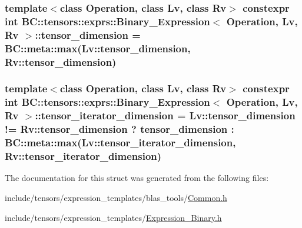 \subsubsection[{\texorpdfstring{tensor\+\_\+dimension}{tensor_dimension}}]{\setlength{\rightskip}{0pt plus 5cm}template$<$class Operation, class Lv, class Rv$>$ constexpr int {\bf B\+C\+::tensors\+::exprs\+::\+Binary\+\_\+\+Expression}$<$ Operation, Lv, Rv $>$\+::tensor\+\_\+dimension = B\+C\+::meta\+::max(Lv\+::tensor\+\_\+dimension, Rv\+::tensor\+\_\+dimension)\hspace{0.3cm}{\ttfamily [static]}}\hypertarget{structBC_1_1tensors_1_1exprs_1_1Binary__Expression_a73afe6b099afa4ef242e6eb7be50ebef}{}\label{structBC_1_1tensors_1_1exprs_1_1Binary__Expression_a73afe6b099afa4ef242e6eb7be50ebef}
\subsubsection[{\texorpdfstring{tensor\+\_\+iterator\+\_\+dimension}{tensor_iterator_dimension}}]{\setlength{\rightskip}{0pt plus 5cm}template$<$class Operation, class Lv, class Rv$>$ constexpr int {\bf B\+C\+::tensors\+::exprs\+::\+Binary\+\_\+\+Expression}$<$ Operation, Lv, Rv $>$\+::tensor\+\_\+iterator\+\_\+dimension = Lv\+::tensor\+\_\+dimension != Rv\+::tensor\+\_\+dimension ? {\bf tensor\+\_\+dimension} \+: B\+C\+::meta\+::max(Lv\+::tensor\+\_\+iterator\+\_\+dimension, Rv\+::tensor\+\_\+iterator\+\_\+dimension)\hspace{0.3cm}{\ttfamily [static]}}\hypertarget{structBC_1_1tensors_1_1exprs_1_1Binary__Expression_a5fce7af061a989dafb9bed466c811f0d}{}\label{structBC_1_1tensors_1_1exprs_1_1Binary__Expression_a5fce7af061a989dafb9bed466c811f0d}


The documentation for this struct was generated from the following files\+:\begin{DoxyCompactItemize}
\item 
include/tensors/expression\+\_\+templates/blas\+\_\+tools/\hyperlink{tensors_2expression__templates_2blas__tools_2Common_8h}{Common.\+h}\item 
include/tensors/expression\+\_\+templates/\hyperlink{Expression__Binary_8h}{Expression\+\_\+\+Binary.\+h}\end{DoxyCompactItemize}
